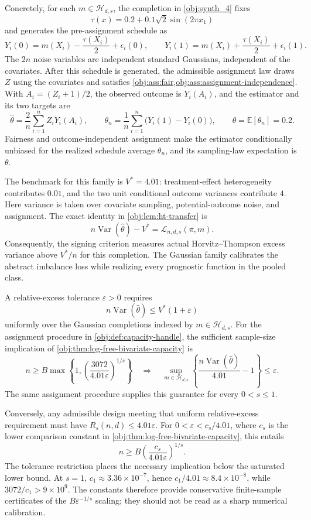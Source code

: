 \documentclass[11pt]{article}
\begin{document}
Concretely, for each \(m\in\mathcal H_{d,s}\), the completion in \cref{obj:synth_4} fixes
\[
\tau(x)=0.2+0.1\sqrt2\sin(2\pi x_1)
\]
and generates the pre-assignment schedule as
\[
Y_i(0)=m(X_i)-\frac{\tau(X_i)}2+\epsilon_i(0),
\qquad
Y_i(1)=m(X_i)+\frac{\tau(X_i)}2+\epsilon_i(1).
\]
The \(2n\) noise variables are independent standard Gaussians, independent of the covariates. After this schedule is generated, the admissible assignment law draws \(Z\) using the covariates and satisfies \cref{obj:ass:fair,obj:ass:assignment-independence}. With \(A_i=(Z_i+1)/2\), the observed outcome is \(Y_i(A_i)\), and the estimator and its two targets are
\[
\widehat\theta=\frac2n\sum_{i=1}^n Z_iY_i(A_i),
\qquad
\theta_n=\frac1n\sum_{i=1}^n\bigl(Y_i(1)-Y_i(0)\bigr),
\qquad
\theta=\mathbb E[\theta_n]=0.2.
\]
Fairness and outcome-independent assignment make the estimator conditionally unbiased for the realized schedule average \(\theta_n\), and its sampling-law expectation is \(\theta\).

The benchmark for this family is \(V^*=4.01\): treatment-effect heterogeneity contributes \(0.01\), and the two unit conditional outcome variances contribute \(4\). Here variance is taken over covariate sampling, potential-outcome noise, and assignment. The exact identity in \cref{obj:lem:ht-transfer} is
\[
n\operatorname{Var}(\widehat\theta)-V^*
=
\mathcal L_{n,d,s}(\pi,m).
\]
Consequently, the signing criterion measures actual Horvitz--Thompson excess variance above \(V^*/n\) for this completion. The Gaussian family calibrates the abstract imbalance loss while realizing every prognostic function in the pooled class.

A relative-excess tolerance \(\varepsilon>0\) requires
\[
n\operatorname{Var}(\widehat\theta)
\leq V^*(1+\varepsilon)
\]
uniformly over the Gaussian completions indexed by \(m\in\mathcal H_{d,s}\). For the assignment procedure in \cref{obj:def:capacity-handle}, the sufficient sample-size implication of \cref{obj:thm:log-free-bivariate-capacity} is
\[
n\geq B\max\left\{
1,\left(\frac{3072}{4.01\varepsilon}\right)^{1/s}
\right\}
\quad\Longrightarrow\quad
\sup_{m\in\mathcal H_{d,s}}
\left\{
\frac{n\operatorname{Var}(\widehat\theta)}{4.01}-1
\right\}
\leq\varepsilon.
\]
The same assignment procedure supplies this guarantee for every \(0<s\leq1\).

Conversely, any admissible design meeting that uniform relative-excess requirement must have \(R_s(n,d)\leq4.01\varepsilon\). For \(0<\varepsilon<c_s/4.01\), where \(c_s\) is the lower comparison constant in \cref{obj:thm:log-free-bivariate-capacity}, this entails
\[
n\geq B\left(\frac{c_s}{4.01\varepsilon}\right)^{1/s}.
\]
The tolerance restriction places the necessary implication below the saturated lower bound. At \(s=1\), \(c_1\approx3.36\times10^{-7}\), hence \(c_1/4.01\approx8.4\times10^{-8}\), while \(3072/c_1>9\times10^9\). The constants therefore provide conservative finite-sample certificates of the \(B\varepsilon^{-1/s}\) scaling; they should not be read as a sharp numerical calibration.
\end{document}
